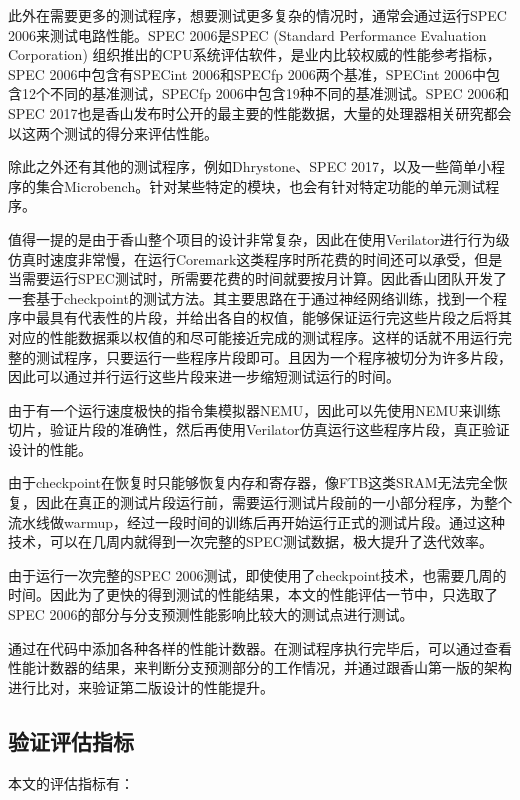 此外在需要更多的测试程序，想要测试更多复杂的情况时，通常会通过运行SPEC 2006来测试电路性能。SPEC 2006是SPEC (Standard Performance Evaluation Corporation) 组织推出的CPU系统评估软件，是业内比较权威的性能参考指标，SPEC 2006中包含有SPECint 2006和SPECfp 2006两个基准，SPECint 2006中包含12个不同的基准测试，SPECfp 2006中包含19种不同的基准测试。SPEC 2006和SPEC 2017也是香山发布时公开的最主要的性能数据，大量的处理器相关研究都会以这两个测试的得分来评估性能。

除此之外还有其他的测试程序，例如Dhrystone、SPEC 2017，以及一些简单小程序的集合Microbench。针对某些特定的模块，也会有针对特定功能的单元测试程序。


值得一提的是由于香山整个项目的设计非常复杂，因此在使用Verilator进行行为级仿真时速度非常慢，在运行Coremark这类程序时所花费的时间还可以承受，但是当需要运行SPEC测试时，所需要花费的时间就要按月计算。因此香山团队开发了一套基于checkpoint的测试方法。其主要思路在于通过神经网络训练，找到一个程序中最具有代表性的片段，并给出各自的权值，能够保证运行完这些片段之后将其对应的性能数据乘以权值的和尽可能接近完成的测试程序。这样的话就不用运行完整的测试程序，只要运行一些程序片段即可。且因为一个程序被切分为许多片段，因此可以通过并行运行这些片段来进一步缩短测试运行的时间。

由于有一个运行速度极快的指令集模拟器NEMU，因此可以先使用NEMU来训练切片，验证片段的准确性，然后再使用Verilator仿真运行这些程序片段，真正验证设计的性能。

由于checkpoint在恢复时只能够恢复内存和寄存器，像FTB这类SRAM无法完全恢复，因此在真正的测试片段运行前，需要运行测试片段前的一小部分程序，为整个流水线做warmup，经过一段时间的训练后再开始运行正式的测试片段。通过这种技术，可以在几周内就得到一次完整的SPEC测试数据，极大提升了迭代效率。

由于运行一次完整的SPEC 2006测试，即使使用了checkpoint技术，也需要几周的时间。因此为了更快的得到测试的性能结果，本文的性能评估一节中，只选取了SPEC 2006的部分与分支预测性能影响比较大的测试点进行测试。

通过在代码中添加各种各样的性能计数器。在测试程序执行完毕后，可以通过查看性能计数器的结果，来判断分支预测部分的工作情况，并通过跟香山第一版的架构进行比对，来验证第二版设计的性能提升。

\subsection{验证评估指标}

本文的评估指标有：

